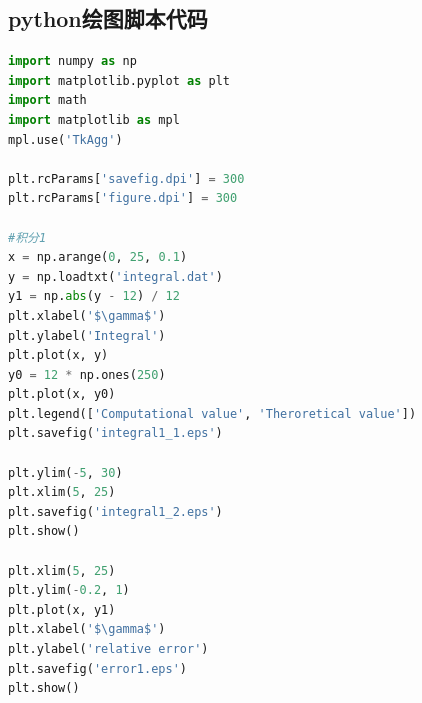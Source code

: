 \documentclass[12pt,a4paper,utf8]{ctexart}
\begin{document}
\subsection{python绘图脚本代码}
\begin{framed}
\begin{lstlisting}[language=python]
import numpy as np
import matplotlib.pyplot as plt
import math
import matplotlib as mpl
mpl.use('TkAgg')

plt.rcParams['savefig.dpi'] = 300
plt.rcParams['figure.dpi'] = 300

#积分1
x = np.arange(0, 25, 0.1)
y = np.loadtxt('integral.dat')
y1 = np.abs(y - 12) / 12
plt.xlabel('$\gamma$')
plt.ylabel('Integral')
plt.plot(x, y)
y0 = 12 * np.ones(250)
plt.plot(x, y0)
plt.legend(['Computational value', 'Theroretical value'])
plt.savefig('integral1_1.eps')

plt.ylim(-5, 30)
plt.xlim(5, 25)
plt.savefig('integral1_2.eps')
plt.show()

plt.xlim(5, 25)
plt.ylim(-0.2, 1)
plt.plot(x, y1)
plt.xlabel('$\gamma$')
plt.ylabel('relative error')
plt.savefig('error1.eps')
plt.show()
\end{lstlisting}
\end{framed}
\end{document}
